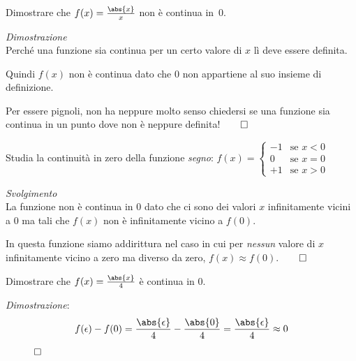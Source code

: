 \begin{esempio}
Dimostrare che \(f(x)=\frac{\abs{x}}{x}\) non è continua in~0.

{
\emph{Dimostrazione}\\
Perché una funzione sia continua per un certo valore di \(x\) 
lì deve essere definita. 

Quindi \(f(x)\) non è continua dato che \(0\) non appartiene al suo insieme 
di definizione.

Per essere pignoli, non ha neppure molto senso chiedersi se una funzione sia 
continua in un punto dove non è neppure definita!\hfill \(\qed\)
}{
\scalebox{1}{\contsecondo}
}
\end{esempio}

\newpage %

\begin{esempio}
Studia la continuità in zero della funzione \emph{segno}:
\(f(x)=\begin{cases} 
    -1 & \text{se } x < 0 \\ 
     0 & \text{se } x = 0 \\ 
    +1 & \text{se } x > 0
  \end{cases}
\)

{
\emph{Svolgimento}\\
La funzione non è continua in \(0\) dato che ci sono dei valori 
\(x\) infinitamente vicini a \(0\) ma tali che \(f(x)\) non è infinitamente 
vicino a \(f(0)\). 

In questa funzione siamo addirittura nel caso in cui per \emph{nessun} 
valore di \(x\) infinitamente vicino a zero ma diverso da zero, 
\(f(x) \approx f(0)\).\hfill \(\qed\)
}{
\scalebox{1}{\fsegno}
}
\end{esempio}

{
\begin{esempio}
 Dimostrare che \(f(x)=\frac{\abs{x}}{4}\) è continua in \(0\).

\emph{Dimostrazione}:
\[f(\epsilon) - f(0) = \frac{\abs{\epsilon}}{4} - \frac{\abs{0}}{4} = 
 \frac{\abs{\epsilon}}{4} \approx 0\]
~ \hfill \(\qed\)
\end{esempio}
}{
\scalebox{1}{\contterzo}
}

\vspace{1em}

